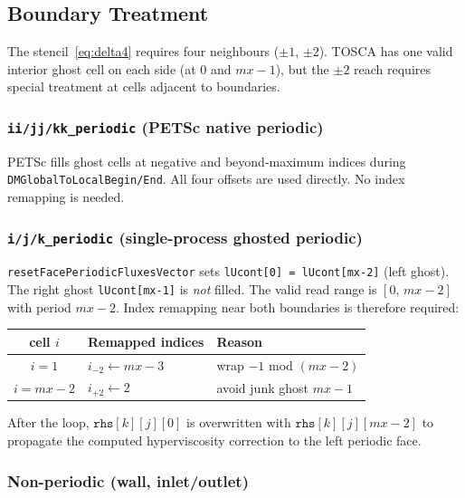 \documentclass[12pt,a4paper]{article}
\begin{document}
	\subsection{Boundary Treatment}
	\label{sec:hypervisc:bc}

	The stencil~\eqref{eq:delta4} requires four neighbours ($\pm 1$,
	$\pm 2$). TOSCA has one valid interior ghost cell on each side (at
	$0$ and $mx-1$), but the $\pm 2$ reach requires special treatment
	at cells adjacent to boundaries.

	\subsubsection{\texttt{ii/jj/kk\_periodic} (PETSc native periodic)}

	PETSc fills ghost cells at negative and beyond-maximum indices during
	\texttt{DMGlobalToLocalBegin/End}. All four offsets are used directly.
	No index remapping is needed.

	\subsubsection{\texttt{i/j/k\_periodic} (single-process ghosted periodic)}

	\texttt{resetFacePeriodicFluxesVector} sets
	\texttt{lUcont[0] = lUcont[mx-2]} (left ghost). The right ghost
	\texttt{lUcont[mx-1]} is \emph{not} filled. The valid
	read range is $[0,\,mx-2]$ with period $mx-2$.
	Index remapping near both boundaries is therefore required:

	\begin{center}
		\begin{tabular}{cll}
			\toprule
			cell $i$ & Remapped indices & Reason \\
			\midrule
			$i = 1$ & $i_{-2} \leftarrow mx-3$ & wrap $-1$ mod $(mx-2)$ \\
			$i = mx-2$ & $i_{+2} \leftarrow 2$ & avoid junk ghost $mx-1$ \\
			\bottomrule
		\end{tabular}
	\end{center}

	After the loop, $\texttt{rhs}[k][j][0]$ is overwritten with
	$\texttt{rhs}[k][j][mx-2]$ to propagate the computed
	hyperviscosity correction to the left periodic face.

	\subsubsection{Non-periodic (wall, inlet/outlet)}
\end{document}
